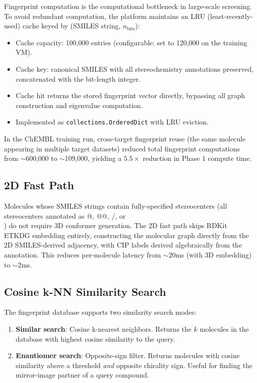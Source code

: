 \documentclass[11pt,a4paper]{article}
\begin{document}
Fingerprint computation is the computational bottleneck in large-scale screening.
To avoid redundant computation, the platform maintains an LRU (least-recently-used)
cache keyed by (SMILES string, $n_{\text{bits}}$):

\begin{itemize}[leftmargin=1.5em]
  \item Cache capacity: 100,000 entries (configurable; set to 120,000 on the
    training VM).
  \item Cache key: canonical SMILES with all stereochemistry annotations
    preserved, concatenated with the bit-length integer.
  \item Cache hit returns the stored fingerprint vector directly, bypassing
    all graph construction and eigenvalue computation.
  \item Implemented as \texttt{collections.OrderedDict} with LRU eviction.
\end{itemize}

In the ChEMBL training run, cross-target fingerprint reuse (the same molecule
appearing in multiple target datasets) reduced total fingerprint computations
from $\sim$600,000 to $\sim$109,000, yielding a $5.5\times$ reduction in
Phase 1 compute time.

\subsection{2D Fast Path}

Molecules whose SMILES strings contain fully-specified stereocenters (all
stereocenters annotated as @, @@, /, or \\) do not require 3D conformer
generation. The 2D fast path skips RDKit ETKDG embedding entirely, constructing
the molecular graph directly from the 2D SMILES-derived adjacency, with CIP
labels derived algebraically from the annotation. This reduces per-molecule
latency from $\sim$20ms (with 3D embedding) to $\sim$2ms.

\subsection{Cosine k-NN Similarity Search}

The fingerprint database supports two similarity search modes:

\begin{enumerate}[leftmargin=1.5em]
  \item \textbf{Similar search}: Cosine k-nearest neighbors. Returns the $k$
    molecules in the database with highest cosine similarity to the query.
  \item \textbf{Enantiomer search}: Opposite-sign filter. Returns molecules
    with cosine similarity above a threshold \textit{and} opposite chirality
    sign. Useful for finding the mirror-image partner of a query compound.
\end{enumerate}
\end{document}
